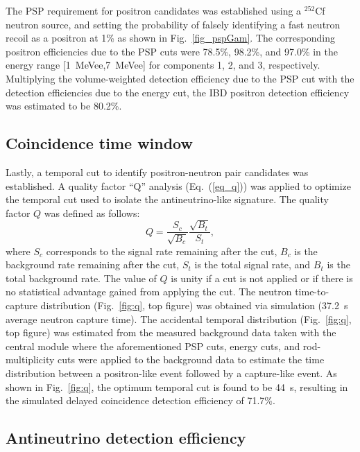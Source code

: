 \documentclass[final,5p,times,twocolumn]{elsarticle}
\begin{document}
The PSP requirement  for positron candidates was established using a $^{252}$Cf neutron source, and setting the probability of falsely identifying a fast neutron recoil as a positron at 1\% as shown in Fig.~\ref{fig_pspGam}. The corresponding positron efficiencies due to the PSP cuts were 78.5\%, 98.2\%, and 97.0\% in the energy range [1~MeVee,7~MeVee] for components 1, 2, and 3, respectively. Multiplying the volume-weighted detection efficiency due to the PSP cut with the detection efficiencies due to the energy cut, the IBD positron detection efficiency was estimated to be 80.2\%.

\subsection{Coincidence time window}

Lastly, a temporal cut to identify positron-neutron pair candidates was established. 
A quality factor ``Q'' analysis (Eq.~(\ref{eq_q})) was applied to optimize the temporal cut used to isolate the antineutrino-like signature. The quality factor $Q$ was defined as follows:
%
\begin{equation}\label{eq_q}
    Q = \frac{S_c}{\sqrt{B_c}} \frac{\sqrt{B_t}}{S_t},
\end{equation}
%
where $S_c$ corresponds to the signal rate remaining after the cut, $B_c$ is the background rate remaining after the cut, $S_t$ is the total signal rate, and $B_t$ is the total background rate. The value of $Q$ is unity if a cut is not applied or if there is no statistical advantage gained from applying the cut. 
The neutron time-to-capture distribution (Fig.~\ref{fig:q}, top figure) was obtained via simulation (37.2~{\textmu}s average neutron capture time). 
The accidental temporal distribution (Fig.~\ref{fig:q}, top figure) was estimated from the measured background data taken with the central module where the aforementioned PSP cuts, energy cuts, and rod-multiplicity cuts were applied to the background data to estimate the time distribution between a positron-like event followed by a capture-like event.
As shown in Fig.~\ref{fig:q}, the optimum temporal cut is found to be 44~{\textmu}s, resulting in the simulated delayed coincidence detection efficiency of 71.7\%. 

\subsection{Antineutrino detection efficiency}
\end{document}
